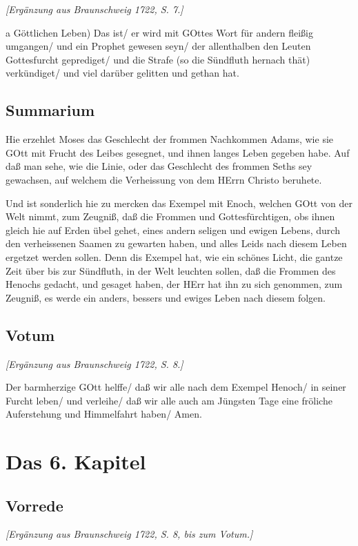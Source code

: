 \emph{[Ergänzung aus Braunschweig 1722, S. 7.]}

a Göttlichen Leben) Das ist/ er wird mit GOttes Wort für andern fleißig umgangen/ und ein Prophet gewesen seyn/ der allenthalben den Leuten Gottesfurcht geprediget/ und die Strafe (so die Sündfluth hernach thät) verkündiget/ und viel darüber gelitten und gethan hat.

\section{Summarium}

Hie erzehlet Moses das Geschlecht der frommen Nachkommen Adams, wie sie GOtt mit Frucht des Leibes gesegnet, und ihnen langes Leben gegeben habe. Auf daß man sehe, wie die Linie, oder das Geschlecht des frommen Seths sey gewachsen, auf welchem die Verheissung von dem HErrn Christo beruhete.

Und ist sonderlich hie zu mercken das Exempel mit Enoch, welchen GOtt von der Welt nimmt, zum Zeugniß, daß die Frommen und Gottesfürchtigen, obs ihnen gleich hie auf Erden übel gehet, eines andern seligen und ewigen Lebens, durch den verheissenen Saamen zu gewarten haben, und alles Leids nach diesem Leben ergetzet werden sollen. Denn dis Exempel hat, wie ein schönes Licht, die gantze Zeit über bis zur Sündfluth, in der Welt leuchten sollen, daß die Frommen des Henochs gedacht, und gesaget haben, der HErr hat ihn zu sich genommen, zum Zeugniß, es werde ein anders, bessers und ewiges Leben nach diesem folgen.

\section{Votum}

\emph{[Ergänzung aus Braunschweig 1722, S. 8.]}

Der barmherzige GOtt helffe/ daß wir alle nach dem Exempel Henoch/ in seiner Furcht leben/ und verleihe/ daß wir alle auch am Jüngsten Tage eine fröliche Auferstehung und Himmelfahrt haben/ Amen.

\chapter{Das 6. Kapitel}

\section{Vorrede}

\emph{[Ergänzung aus Braunschweig 1722, S. 8, bis zum Votum.]}


